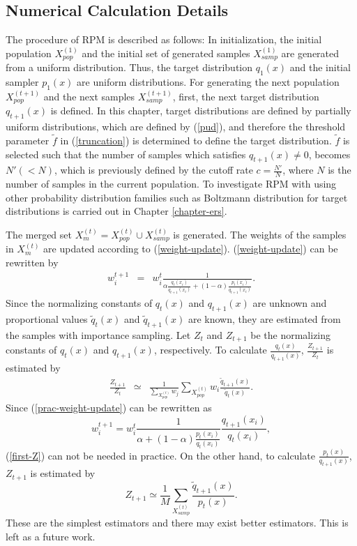 \subsection{Numerical Calculation  Details}
\label{sec-rpm-detail}
The procedure of RPM is described as follows:
In initialization,
the initial population $X_{pop}^{(1)}$ and 
the initial set of generated samples $X_{samp}^{(1)}$ are generated
from a uniform distribution.
Thus, the target distribution $q_1(x)$
and
the initial sampler $p_1(x)$ are uniform distributions.
For generating the next population $X_{pop}^{(t+1)}$ and 
the next samples $X_{samp}^{(t+1)}$,
first, the next target distribution $q_{t+1}(x)$ is defined.
In this chapter,
target distributions are defined by partially uniform
distributions,
which are defined by (\ref{pud}), and therefore
the threshold parameter $\tilde f$ in (\ref{truncation})
is determined to define the target distribution.
$\tilde f$ is selected
such that the number of samples which satisfies $q_{t+1}(x) \neq 0$,  
becomes $N'(<N)$, which is previously defined by the cutoff rate
$c=\frac{N'}{N}$, where $N$ is the number of samples 
in the current population. 
To investigate RPM with using other probability distribution families
such as Boltzmann distribution for target distributions 
is carried out in Chapter \ref{chapter-ers}.

The merged set $X_m^{(t)}=X_{pop}^{(t)} \cup X_{samp}^{(t)}$
is generated.
The weights of the samples in $X_m^{(t)}$ are updated according to
(\ref{weight-update}).
(\ref{weight-update}) can be rewritten by
\begin{eqnarray}
w_i^{t+1}&=&w_i^{t}
 \frac{1}{
\alpha \frac{q_{t}(x_i)}{q_{t+1}(x_i)} 
+ (1-\alpha) \frac{p_{t}(x_i)}{q_{t+1}(x_i)}
}
\label{prac-weight-update}
.
\end{eqnarray}
Since the normalizing constants of $q_{t}(x)$ and $q_{t+1}(x)$ are
unknown
and proportional values $\tilde q_t(x)$ and $\tilde q_{t+1} (x)$ are known,
they are estimated from the samples with importance sampling.
Let $Z_{t}$ and $Z_{t+1}$ be the normalizing constants
of $q_{t}(x)$ and $q_{t+1}(x)$, respectively.
To calculate $\frac{q_{t}(x)}{q_{t+1}(x)}$, $\frac{Z_{t+1}}{Z_{t}}$ is estimated by
\begin{eqnarray}
 \frac{Z_{t+1}}{Z_{t}} 
&\simeq& \frac{1}{\sum_{X_{pop}^{(t)}} w_j} 
\sum_{X_{pop}^{(t)}} w_i \frac{\tilde
q_{t+1}(x)}{\tilde q_{t}(x)}
.\label{first-Z}
\end{eqnarray}
Since (\ref{prac-weight-update}) can be rewritten as
\begin{equation}
w_i^{t+1}=w_i^{t}
 \frac{1}{
\alpha  
+ (1-\alpha) \frac{p_{t}(x_i)}{q_{t}(x_i)}
} \frac{q_{t+1}(x_i)}{q_{t}(x_i)},
\end{equation}
(\ref{first-Z}) can not be needed in practice.
On the other hand, 
to calculate $\frac{p_{t}(x)}{q_{t+1}(x)}$, 
$Z_{t+1}$ is estimated by
\begin{equation}
 Z_{t+1} \simeq \frac{1}{M} \sum_{X_{samp}^{(t)}} \frac{\tilde
  q_{t+1}(x)}{p_{t}(x)}
.\label{second-Z}
\end{equation}
These are the simplest estimators and
there may exist better estimators.
This is left as a future work.


